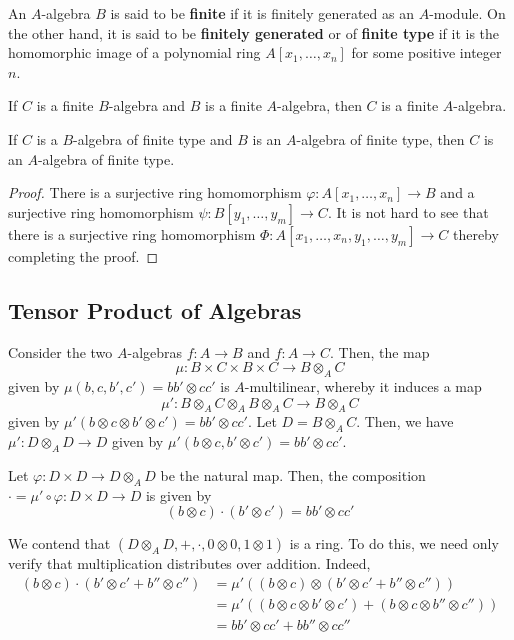 An $A$-algebra $B$ is said to be \textbf{finite} if it is finitely generated as an $A$-module. On the other hand, it is said to be \textbf{finitely generated} or of \textbf{finite type} if it is the homomorphic image of a polynomial ring $A[x_1,\ldots,x_n]$ for some positive integer $n$.

\begin{proposition}
    If $C$ is a finite $B$-algebra and $B$ is a finite $A$-algebra, then $C$ is a finite $A$-algebra.
\end{proposition}

\begin{proposition}
    If $C$ is a $B$-algebra of finite type and $B$ is an $A$-algebra of finite type, then $C$ is an $A$-algebra of finite type.
\end{proposition}
\begin{proof}
    There is a surjective ring homomorphism $\varphi: A[x_1,\ldots,x_n]\to B$ and a surjective ring homomorphism $\psi: B[y_1,\ldots,y_m]\to C$. It is not hard to see that there is a surjective ring homomorphism $\Phi: A[x_1,\ldots,x_n,y_1,\ldots,y_m]\to C$ thereby completing the proof.
\end{proof}

\subsection{Tensor Product of Algebras}

Consider the two $A$-algebras $f: A\to B$ and $f: A\to C$. Then, the map 
\begin{equation*}
    \mu: B\times C\times B\times C\to B\otimes_A C
\end{equation*}
given by $\mu(b,c,b',c') = bb'\otimes cc'$ is $A$-multilinear, whereby it induces a map 
\begin{equation*}
    \mu': B\otimes_A C\otimes_A B\otimes_A C\to B\otimes_A C 
\end{equation*}
given by $\mu'(b\otimes c\otimes b'\otimes c') = bb'\otimes cc'$. Let $D = B\otimes_A C$. Then, we have $\mu': D\otimes_A D\to D$ given by $\mu'(b\otimes c,b'\otimes c') = bb'\otimes cc'$.

Let $\varphi: D\times D\to D\otimes_A D$ be the natural map. Then, the composition $\cdot = \mu'\circ\varphi: D\times D\to D$ is given by 
\begin{equation*}
    (b\otimes c)\cdot(b'\otimes c') = bb'\otimes cc'
\end{equation*}

We contend that $(D\otimes_A D,+,\cdot,0\otimes 0, 1\otimes 1)$ is a ring. To do this, we need only verify that multiplication distributes over addition. Indeed, 
\begin{align*}
    (b\otimes c)\cdot(b'\otimes c' + b''\otimes c'') &= \mu'\left((b\otimes c)\otimes (b'\otimes c' + b''\otimes c'')\right)\\
    &= \mu'((b\otimes c\otimes b'\otimes c') + (b\otimes c\otimes b''\otimes c''))\\
    &= bb'\otimes cc' + bb''\otimes cc''
\end{align*}

